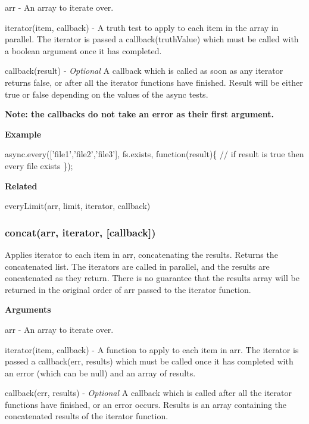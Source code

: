 \begin{DoxyItemize}
\item {\ttfamily arr} -\/ An array to iterate over.
\item {\ttfamily iterator(item, callback)} -\/ A truth test to apply to each item in the array in parallel. The iterator is passed a {\ttfamily callback(truth\+Value)} which must be called with a boolean argument once it has completed.
\item {\ttfamily callback(result)} -\/ {\itshape Optional} A callback which is called as soon as any iterator returns {\ttfamily false}, or after all the iterator functions have finished. Result will be either {\ttfamily true} or {\ttfamily false} depending on the values of the async tests.

{\bfseries Note\+: the callbacks do not take an error as their first argument.}
\end{DoxyItemize}

{\bfseries Example}


\begin{DoxyCode}
async.every(['file1','file2','file3'], fs.exists, function(result)\{
    // if result is true then every file exists
\});
\end{DoxyCode}


{\bfseries Related}


\begin{DoxyItemize}
\item every\+Limit(arr, limit, iterator, callback) 


\end{DoxyItemize}

\label{_concat}%
 \subsubsection*{concat(arr, iterator, \mbox{[}callback\mbox{]})}

Applies {\ttfamily iterator} to each item in {\ttfamily arr}, concatenating the results. Returns the concatenated list. The {\ttfamily iterator}s are called in parallel, and the results are concatenated as they return. There is no guarantee that the results array will be returned in the original order of {\ttfamily arr} passed to the {\ttfamily iterator} function.

{\bfseries Arguments}


\begin{DoxyItemize}
\item {\ttfamily arr} -\/ An array to iterate over.
\item {\ttfamily iterator(item, callback)} -\/ A function to apply to each item in {\ttfamily arr}. The iterator is passed a {\ttfamily callback(err, results)} which must be called once it has completed with an error (which can be {\ttfamily null}) and an array of results.
\item {\ttfamily callback(err, results)} -\/ {\itshape Optional} A callback which is called after all the {\ttfamily iterator} functions have finished, or an error occurs. Results is an array containing the concatenated results of the {\ttfamily iterator} function.
\end{DoxyItemize}

